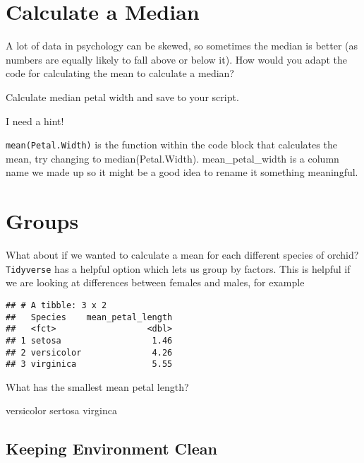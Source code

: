 \documentclass[]{book}
\newenvironment{Shaded}{\begin{snugshade}}{\end{snugshade}}
\newcommand{\DataTypeTok}[1]{\textcolor[rgb]{0.13,0.29,0.53}{#1}}
\newcommand{\KeywordTok}[1]{\textcolor[rgb]{0.13,0.29,0.53}{\textbf{#1}}}
\newcommand{\NormalTok}[1]{#1}
\newcommand{\OperatorTok}[1]{\textcolor[rgb]{0.81,0.36,0.00}{\textbf{#1}}}
\newcommand{\StringTok}[1]{\textcolor[rgb]{0.31,0.60,0.02}{#1}}
\begin{document}
\hypertarget{calculate-a-median}{%
\section{Calculate a Median}\label{calculate-a-median}}

A lot of data in psychology can be skewed, so sometimes the median is better (as numbers are equally likely to fall above or below it). How would you adapt the code for calculating the mean to calculate a median?

Calculate median petal width and save to your script.

I need a hint!

\texttt{mean(Petal.Width)} is the function within the code block that calculates the mean, try changing to median(Petal.Width). mean\_petal\_width is a column name we made up so it might be a good idea to rename it something meaningful.

\hypertarget{groups}{%
\section{Groups}\label{groups}}

What about if we wanted to calculate a mean for each different species of orchid? \texttt{Tidyverse} has a helpful option which lets us group by factors. This is helpful if we are looking at differences between females and males, for example

\begin{Shaded}
\end{Shaded}

\begin{verbatim}
## # A tibble: 3 x 2
##   Species    mean_petal_length
##   <fct>                  <dbl>
## 1 setosa                  1.46
## 2 versicolor              4.26
## 3 virginica               5.55
\end{verbatim}

What has the smallest mean petal length?

 versicolor sertosa virginca

\hypertarget{keeping-environment-clean}{%
\subsection{Keeping Environment Clean}\label{keeping-environment-clean}}
\end{document}

